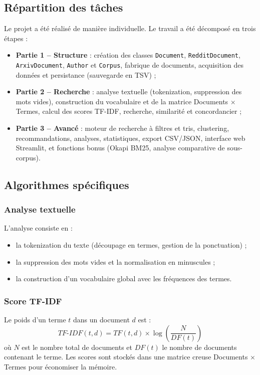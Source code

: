 \documentclass[12pt,a4paper]{article}
\begin{document}
\subsection{Répartition des tâches}

Le projet a été réalisé de manière individuelle. Le travail a été décomposé en trois étapes :

\begin{itemize}
    \item \textbf{Partie 1 -- Structure} : création des classes \texttt{Document}, \texttt{Reddit\-Document}, \texttt{Arxiv\-Document}, \texttt{Author} et \texttt{Corpus}, fabrique de documents, acquisition des données et persistance (sauvegarde en TSV) ;
    \item \textbf{Partie 2 -- Recherche} : analyse textuelle (tokenization, suppression des mots vides), construction du vocabulaire et de la matrice Documents $\times$ Termes, calcul des scores TF-IDF, recherche, similarité et concordancier ;
    \item \textbf{Partie 3 -- Avancé} : moteur de recherche à filtres et tris, clustering, recommandations, analyses, statistiques, export CSV/JSON, interface web Streamlit, et fonctions bonus (Okapi BM25, analyse comparative de sous-corpus).
\end{itemize}

\subsection{Algorithmes spécifiques}

\subsubsection{Analyse textuelle}
L'analyse consiste en :
\begin{itemize}
    \item la tokenization du texte (découpage en termes, gestion de la ponctuation) ;
    \item la suppression des mots vides et la normalisation en minuscules ;
    \item la construction d'un vocabulaire global avec les fréquences des termes.
\end{itemize}

\subsubsection{Score TF-IDF}
Le poids d'un terme $t$ dans un document $d$ est :
$$TF\text{-}IDF(t,d) = TF(t,d) \times \log\left(\frac{N}{DF(t)}\right)$$
où $N$ est le nombre total de documents et $DF(t)$ le nombre de documents contenant le terme. Les scores sont stockés dans une matrice creuse Documents $\times$ Termes pour économiser la mémoire.
\end{document}
